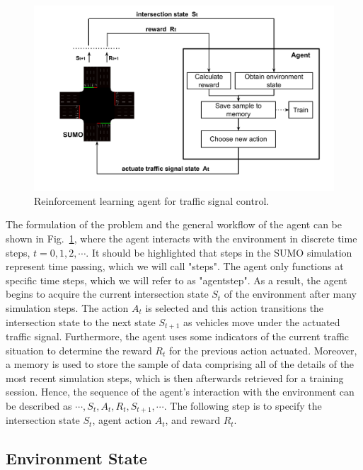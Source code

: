 \documentclass[conference]{IEEEtran}
\begin{document}
\begin{figure}[ht]
    \centering
    \begin{center}
    \includegraphics[scale=0.35]{images/RL_TSC_Scheme.pdf}
    \end{center}
    \caption{Reinforcement learning agent for traffic signal control.}
    \label{fig:2}
\end{figure}

The formulation of the problem and the general workflow of the agent can be shown in Fig.~\ref{fig:2}, where the agent interacts with the environment in discrete time steps, $t = 0, 1, 2, \cdots$. It should be highlighted that steps in the SUMO simulation represent time passing, which we will call "steps". The agent only functions at specific time steps, which we will refer to as "agentstep". As a result, the agent begins to acquire the current intersection state $S_{t}$ of the environment after many simulation steps. The action $A_{t}$ is selected and this action transitions the intersection state to the next state $S_{t+1}$ as vehicles move under the actuated traffic signal. Furthermore, the agent uses some indicators of the current traffic situation to determine the reward $R_{t}$ for the previous action actuated. Moreover, a memory is used to store the sample of data comprising all of the details of the most recent simulation steps, which is then afterwards retrieved for a training session. Hence, the sequence of the agent's interaction with the environment can be described as $\cdots, S_{t}, A_{t}, R_{t}, S_{t+1}, \cdots$. The following step is to specify the intersection state $S_{t}$, agent action $A_{t}$, and reward $R_{t}$. 

\subsection{Environment State}
\end{document}
